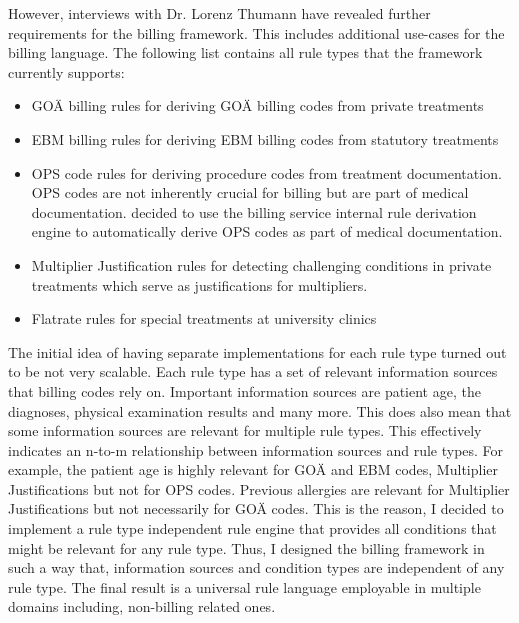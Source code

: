 However, interviews with Dr. Lorenz Thumann have revealed further requirements for the billing framework.
This includes additional use-cases for the billing language.
The following list contains all rule types that the framework currently supports:
\begin{itemize}
    \item GOÄ billing rules for deriving GOÄ billing codes from private treatments
    \item EBM billing rules for deriving EBM billing codes from statutory treatments
    \item OPS code rules for deriving procedure codes from treatment documentation.
    OPS codes are not inherently crucial for billing but are part of medical documentation.
    \AV decided to use the billing service internal rule derivation engine to automatically derive OPS codes as part of medical documentation.
    \item Multiplier Justification rules for detecting challenging conditions in private treatments
    which serve as justifications for multipliers.
    \item Flatrate rules for special treatments at university clinics
\end{itemize}


The initial idea of having separate implementations for each rule type turned out to be not very scalable.
Each rule type has a set of relevant information sources that billing codes rely on.
Important information sources are patient age, the diagnoses, physical examination results and many more.
This does also mean that some information sources are relevant for multiple rule types.
This effectively indicates an n-to-m relationship between information sources and rule types.
For example, the patient age is highly relevant for GOÄ and EBM codes, Multiplier Justifications but not for OPS codes.
Previous allergies are relevant for Multiplier Justifications but not necessarily for GOÄ codes.
This is the reason, I decided to implement a rule type independent rule engine that provides all conditions that might be relevant for any rule type.
Thus, I designed the billing framework in such a way that, information sources and condition types are independent of any rule type.
The final result is a universal rule language employable in multiple domains including, non-billing related ones.

